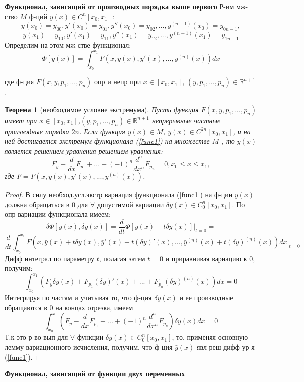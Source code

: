 \documentclass{article}
\newtheorem{theorem}{Теорема}[]
\begin{document}
\textbf{Функционал, зависящий от производных порядка выше
первого}
Р-им мж-ство $M$ ф-ций $y(x) \in C^n[x_0, x_1]:$
$$y(x_0) = y_{00} , y'(x_0) = y_{01}, y''(x_0) = y_{02},..., y^{(n-1)}(x_0) = y_{0n-1},$$
$$y(x_1) = y_{10} , y'(x_1) = y_{11}, y''(x_1) = y_{12},..., y^{(n-1)}(x_1) = y_{1n-1}$$
Определим на этом мж-стве функционал:
\begin{equation}
    \Phi[y(x)]=\int_{x_0}^{x_1}F(x,y(x),y'(x),...,y^{(n)}(x))dx
    \label{func1}
\end{equation}

где ф-ция $F(x,y,p_1,...,p_n)$ опр и непр при $x \in [x_0, x_1]$,
$(y,p_1,..., p_n) \in \mathbb{R}^{n+1}$.
\begin{theorem}[необходимое условие экстремума]
    Пусть функция $F(x,y,p_1,...,p_n)$ имеет при $x\in[x_0, x_1]$,$(y,p_1,..., p_n) \in \mathbb{R}^{n+1}$ непрерывные частные производные порядка $2n$. Если функция $\bar y(x) \in M$, $\bar y(x) \in C^{2n}[x_0, x_1]$, и на ней достигается экстремум функционала (\ref{func1}) на множестве $M$ , то $\bar y(x)$ является решением уравнения
    решением уравнения:
    $$F_y-\frac{d}{dx}F_{p_1}+...+(-1)^n\frac{d^n}{dx^n}F_{p_n}=0, x_0 \leq x \leq x_1,$$
    где $F = F(x,y(x),y'(x),..., y^{(n)}(x))$.
\end{theorem}
\begin{proof}
    В силу необход.усл.экстр вариация
    функционала (\ref{func1}) на ф-ции $\bar y(x)$ должна обращаться в 0 для
    $\forall$ допустимой вариации $\delta y(x) \in C^n_0[x_0, x_1]$.
    По опр вариации функционала имеем:
    $$\delta\Phi[\bar y(x), \delta y(x)]=\frac{d}{dt}\Phi[\bar y(x)+t\delta y(x)]\Big|_{t=0}=$$
    $$\frac{d}{dt}\int_{x_0}^{x_1}F(x,\bar y(x) + t\delta y(x), \bar y'(x)+t(\delta y)'(x),...,\bar y^{(n)}(x)+t(\delta y)^{(n)}(x))dx\Big|_{t=0}$$
    Дифф интеграл по параметру $t$, полагая затем $t = 0$ и приравнивая вариацию к 0, получим:
    $$\int_{x_0}^{x_1}(F_y\delta y(x) + F_{p_1}(\delta y)'(x)+...+F_{p_n}(\delta y)^{(n)}(x))dx=0$$
    Интегрируя по частям и учитывая то, что ф-ция $\delta y(x)$ и ее производные обращаются в 0 на концах отрезка, имеем
    $$\int_{x_0}^{x_1} (F_y-\frac{d}{dx}F_{p_1}+...+(-1)^n\frac{d^n}{dx^n}F_{p_n})\delta y(x) dx=0$$
    Т.к это р-во вып для $\forall$ функции $\delta y(x) \in C^n_0[x_0, x_1]$,
    то, применяя основную лемму вариационного исчисления, получим, что
    ф-ция $\bar y(x)$ явл реш дифф ур-я (\ref{func1}).
\end{proof}
\textbf{Функционал, зависящий от функции двух переменных}
\end{document}
